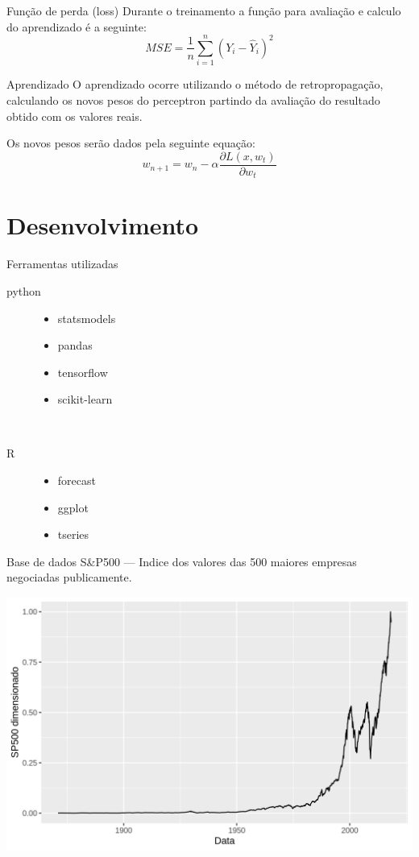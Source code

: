 \documentclass[compress,aspectratio=149,brazil]{beamer}
\begin{document}
\begin{frame}{Função de perda (loss)}
    Durante o treinamento a função para avaliação e calculo do aprendizado é a
    seguinte:
    \[
        MSE = \frac{1}{n}\sum_{i=1}^{n}{{(Y_i - \hat{Y}_i)}^2}
    \]
\end{frame}

\begin{frame}{Aprendizado}
    O aprendizado ocorre utilizando o método de retropropagação, calculando os
    novos pesos do perceptron partindo da avaliação do resultado obtido com os
    valores reais.

    Os novos pesos serão dados pela seguinte equação:
    \[
        w_{n+1} = w_n - \alpha \frac{\partial L(x,w_t)}{\partial w_t}
    \]
\end{frame}

\section{Desenvolvimento}

\begin{frame}{Ferramentas utilizadas}
    \begin{description}
        \item[python]
            \begin{itemize}
                \item statsmodels
                \item pandas
                \item tensorflow
                \item scikit-learn
            \end{itemize}\\
        \item[R]
            \begin{itemize}
                \item forecast
                \item ggplot
                \item tseries
            \end{itemize}
    \end{description}
\end{frame}

\begin{frame}{Base de dados}
    S\&P500 --- Indice dos valores das 500 maiores empresas negociadas
    publicamente.
    \begin{center}
        \includegraphics[width=.8\textwidth]{../images/SP500.png}
    \end{center}
\end{frame}
\end{document}
